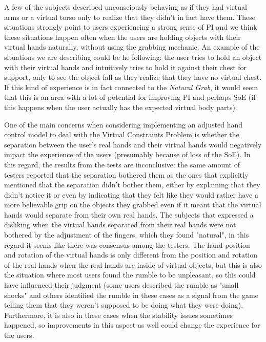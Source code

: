 A few of the subjects described unconsciously behaving as if they had virtual arms or a virtual torso only to realize that they didn't in fact have them. These situations strongly point to users experiencing a strong sense of PI and we think these situations happen often when the users are holding objects with their virtual hands naturally, without using the grabbing mechanic. An example of the situations we are describing could be he following: the user tries to hold an object with their virtual hands and intuitively tries to hold it against their chest for support, only to see the object fall as they realize that they have no virtual chest. If this kind of experience is in fact connected to the \textit{Natural Grab}, it would seem that this is an area with a lot of potential for improving PI and perhaps SoE (if this happens when the user actually has the expected virtual body parts).

One of the main concerns when considering implementing an adjusted hand control model to deal with the Virtual Constraints Problem is whether the separation between the user's real hands and their virtual hands would negatively impact the experience of the users (presumably because of loss of the SoE). In this regard, the results from the tests are inconclusive: the same amount of testers reported that the separation bothered them as the ones that explicitly mentioned that the separation didn't bother them, either by explaining that they didn't notice it or even by indicating that they felt like they would rather have a more believable grip on the objects they grabbed even if it meant that the virtual hands would separate from their own real hands. The subjects that expressed a disliking when the virtual hands separated from their real hands were not bothered by the adjustment of the fingers, which they found "natural", in this regard it seems like there was consensus among the testers. The hand position and rotation of the virtual hands is only different from the position and rotation of the real hands when the real hands are inside of virtual objects, but this is also the situation where most users found the rumble to be unpleasant, so this could have influenced their judgment (some users described the rumble as "small shocks" and others identified the rumble in these cases as a signal from the game telling them that they weren't supposed to be doing what they were doing). Furthermore, it is also in these cases when the stability issues sometimes happened, so improvements in this aspect as well could change the experience for the users. 